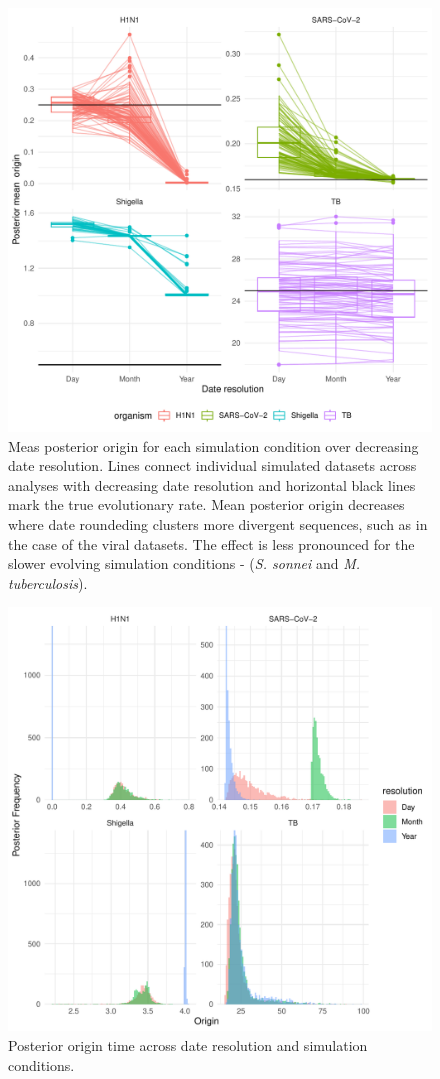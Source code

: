 \documentclass{article}
\begin{document}
\begin{figure}[h!]
    \centering
    \includegraphics{sim_origin_trajectory.pdf}
    \caption{Meas posterior origin for each simulation condition over decreasing date resolution. Lines connect individual simulated datasets across analyses with decreasing date resolution and horizontal black lines mark the true evolutionary rate. Mean posterior origin decreases  where date roundeding clusters more divergent sequences, such as in the case of the viral datasets. The effect is less pronounced for the slower evolving simulation conditions - (\textit{S. sonnei} and \textit{M. tuberculosis}).}
    \label{fig:simOrigin}
\end{figure}

\begin{figure}
    \centering
    \includegraphics{empirical_origin.pdf}
    \caption{Posterior origin time across date resolution and simulation conditions.}
    \label{fig:empOrigin}
\end{figure}
\end{document}
